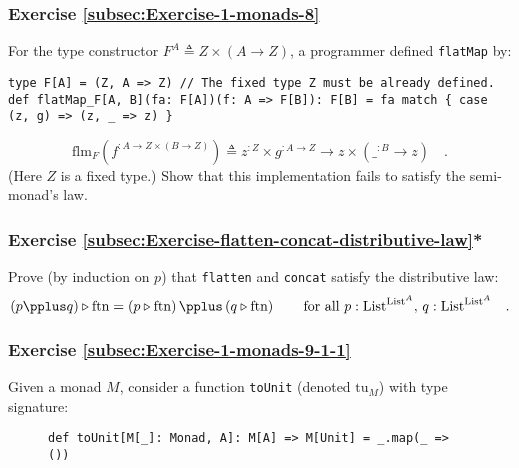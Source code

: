 \subsubsection{Exercise \label{subsec:Exercise-1-monads-8}\ref{subsec:Exercise-1-monads-8}}

For the type constructor $F^{A}\triangleq Z\times\left(A\rightarrow Z\right)$,
a programmer defined \lstinline!flatMap! by:
\begin{lstlisting}
type F[A] = (Z, A => Z) // The fixed type Z must be already defined.
def flatMap_F[A, B](fa: F[A])(f: A => F[B]): F[B] = fa match { case (z, g) => (z, _ => z) }
\end{lstlisting}
\[
\text{flm}_{F}(f^{:A\rightarrow Z\times\left(B\rightarrow Z\right)})\triangleq z^{:Z}\times g^{:A\rightarrow Z}\rightarrow z\times(\_^{:B}\rightarrow z)\quad.
\]
(Here $Z$ is a fixed type.) Show that this implementation fails to
satisfy the semi-monad\textsf{'}s law. 

\subsubsection{Exercise \label{subsec:Exercise-flatten-concat-distributive-law}\ref{subsec:Exercise-flatten-concat-distributive-law}{*}}

Prove (by induction on $p$) that \lstinline!flatten! and \lstinline!concat!
satisfy the distributive law:
\[
\left(p\pplus q\right)\triangleright\text{ftn}=\left(p\triangleright\text{ftn}\right)\pplus\left(q\triangleright\text{ftn}\right)\quad\quad\text{for all }p:\text{List}^{\text{List}^{A}},\,q:\text{List}^{\text{List}^{A}}\quad.
\]


\subsubsection{Exercise \label{subsec:Exercise-1-monads-9-1-1}\ref{subsec:Exercise-1-monads-9-1-1}}

Given a monad $M$, consider a function \lstinline!toUnit! (denoted
$\text{tu}_{M}$) with type signature:

\begin{wrapfigure}{l}{0.61\columnwidth}%
\vspace{-0.5\baselineskip}
\begin{lstlisting}
def toUnit[M[_]: Monad, A]: M[A] => M[Unit] = _.map(_ => ())
\end{lstlisting}

\vspace{-0.5\baselineskip}
\end{wrapfigure}%

